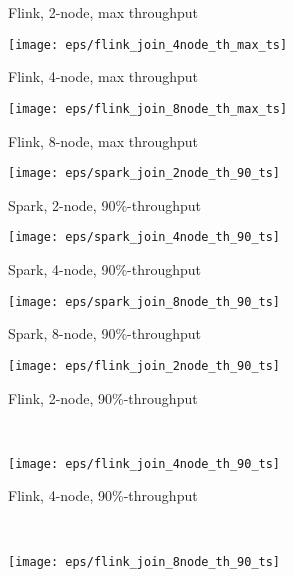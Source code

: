 {\begin{figure*}
\begin{subfigure}[b]{0.3\textwidth}
       \caption{Flink, 2-node, max  throughput}
   \end{subfigure}%
   \begin{subfigure}[b]{0.3\textwidth}
       \texttt{[image: eps/flink\_join\_4node\_th\_max\_ts]}

       \caption{Flink, 4-node, max  throughput }
   \end{subfigure}%
   \begin{subfigure}[b]{0.3\textwidth}
       \texttt{[image: eps/flink\_join\_8node\_th\_max\_ts]}

       \caption{Flink, 8-node, max  throughput }
   \end{subfigure}
   
   
   
   
      \begin{subfigure}[b]{0.3\textwidth}
       \texttt{[image: eps/spark\_join\_2node\_th\_90\_ts]}

       \caption{Spark, 2-node,  90\%-throughput}
   \end{subfigure}%
   \begin{subfigure}[b]{0.3\textwidth}
       \texttt{[image: eps/spark\_join\_4node\_th\_90\_ts]}

       \caption{Spark, 4-node,  90\%-throughput }
   \end{subfigure}%
   \begin{subfigure}[b]{0.3\textwidth}
       \texttt{[image: eps/spark\_join\_8node\_th\_90\_ts]}

       \caption{Spark, 8-node,  90\%-throughput }
   \end{subfigure}




   \begin{subfigure}[b]{0.3\textwidth}
       \texttt{[image: eps/flink\_join\_2node\_th\_90\_ts]}

       \caption{Flink, 2-node,  90\%-throughput}
   \end{subfigure}
   ~ 
   \begin{subfigure}[b]{0.3\textwidth}
       \texttt{[image: eps/flink\_join\_4node\_th\_90\_ts]}

       \caption{Flink, 4-node,  90\%-throughput }
   \end{subfigure}
   ~ 
   \begin{subfigure}[b]{0.3\textwidth}
       \texttt{[image: eps/flink\_join\_8node\_th\_90\_ts]}


\end{subfigure}
\end{figure*}}
